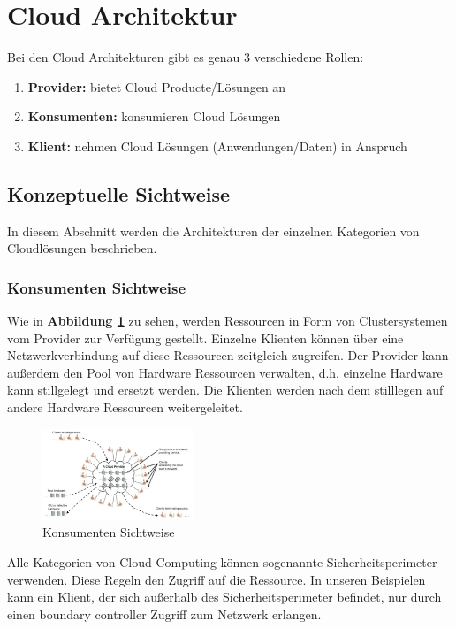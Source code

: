 \section{Cloud Architektur}

Bei den Cloud Architekturen gibt es genau 3 verschiedene Rollen:
\begin{enumerate}
	\item \textbf{Provider:} bietet Cloud Producte/Lösungen an
	\item \textbf{Konsumenten:} konsumieren Cloud Lösungen
	\item \textbf{Klient:} nehmen Cloud Lösungen
	 (Anwendungen/Daten) in Anspruch
\end{enumerate}

\subsection{Konzeptuelle Sichtweise}

In diesem Abschnitt werden die Architekturen der einzelnen Kategorien von Cloudlösungen beschrieben.

\subsubsection{Konsumenten Sichtweise}

Wie in \textbf{Abbildung \ref{ConsumerView}} zu sehen, werden Ressourcen in Form von Clustersystemen vom Provider zur Verfügung gestellt.
Einzelne Klienten können über eine Netzwerkverbindung auf diese Ressourcen zeitgleich zugreifen. Der Provider kann außerdem den Pool
von Hardware Ressourcen verwalten, d.h. einzelne Hardware kann stillgelegt und ersetzt werden. Die Klienten werden nach dem stilllegen
auf andere Hardware Ressourcen weitergeleitet.
\begin{figure}[H]
    \centering
	\includegraphics[width=0.4\textwidth]{Images/ConsumerView}
	\caption{Konsumenten Sichtweise \cite{Badger}}
	\label{ConsumerView}
\end{figure}


Alle Kategorien von Cloud-Computing können sogenannte Sicherheitsperimeter verwenden. Diese Regeln den Zugriff auf die Ressource.
In unseren Beispielen kann ein Klient, der sich außerhalb des Sicherheitsperimeter befindet, nur durch einen \glqq boundary controller\grqq
Zugriff zum Netzwerk erlangen.

